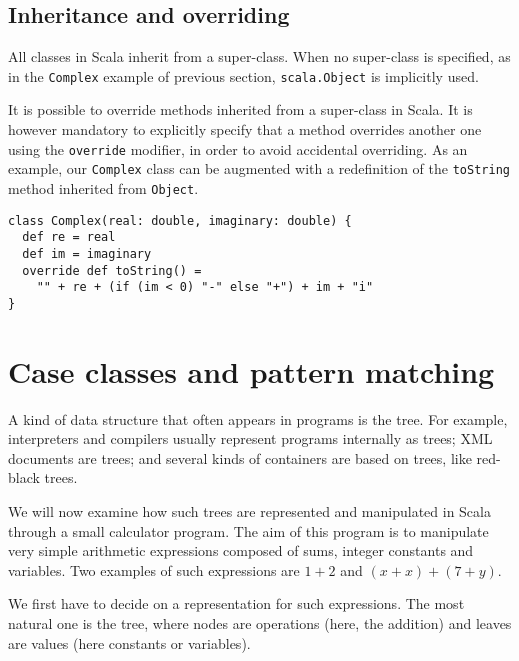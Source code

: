 \documentclass[a4paper,11pt,twoside,titlepage]{article}
\begin{document}
\subsection*{Inheritance and overriding}
\label{sec:inheritance}

All classes in Scala inherit from a super-class. When no super-class
is specified, as in the \lstinline?Complex? example of previous section,
\lstinline?scala.Object? is implicitly used.

It is possible to override methods inherited from a super-class in
Scala. It is however mandatory to explicitly specify that a method
overrides another one using the \lstinline?override? modifier, in order to
avoid accidental overriding. As an example, our \lstinline?Complex? class
can be augmented with a redefinition of the \lstinline?toString? method
inherited from \lstinline?Object?.
\begin{lstlisting}
class Complex(real: double, imaginary: double) {
  def re = real
  def im = imaginary
  override def toString() =
    "" + re + (if (im < 0) "-" else "+") + im + "i"
}
\end{lstlisting}

\section*{Case classes and pattern matching}
\label{sec:case-classes-pattern}

A kind of data structure that often appears in programs is the tree.
For example, interpreters and compilers usually represent programs
internally as trees; XML documents are trees; and several kinds of
containers are based on trees, like red-black trees.

We will now examine how such trees are represented and manipulated in
Scala through a small calculator program. The aim of this program is
to manipulate very simple arithmetic expressions composed of sums,
integer constants and variables. Two examples of such expressions are
$1+2$ and $(x+x)+(7+y)$.

We first have to decide on a representation for such expressions. The
most natural one is the tree, where nodes are operations (here, the
addition) and leaves are values (here constants or variables).
\end{document}
